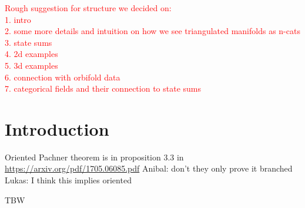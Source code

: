 
\textcolor{red}{Rough suggestion for structure we decided on:
\\
1. intro
\\
2. some more details and intuition on how we see triangulated manifolds as n-cats
\\
3. state sums
\\
4. 2d examples
\\
5. 3d examples
\\
6. connection with orbifold data
\\
7. categorical fields and their connection to state sums
}


\section{Introduction} \label{s:introduction}

Oriented Pachner theorem is in proposition 3.3 in \url{https://arxiv.org/pdf/1705.06085.pdf}
Anibal:  don't they only prove it branched
Lukas: I think this implies oriented

\noindent TBW